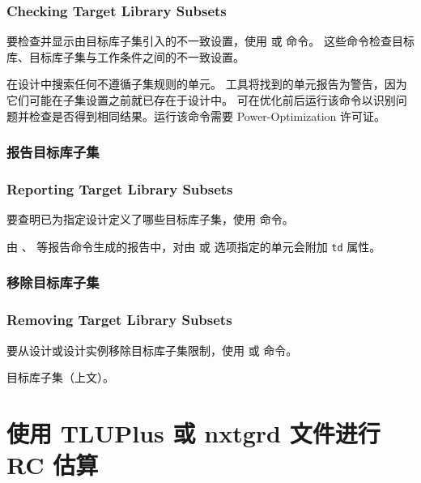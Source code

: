 \subsubsection*{Checking Target Library Subsets}

要检查并显示由目标库子集引入的不一致设置，使用  或
 命令。
这些命令检查目标库、目标库子集与工作条件之间的不一致设置。

 在设计中搜索任何不遵循子集规则的单元。
工具将找到的单元报告为警告，因为它们可能在子集设置之前就已存在于设计中。
可在优化前后运行该命令以识别问题并检查是否得到相同结果。运行该命令需要 Power-Optimization 许可证。

\subsubsection{报告目标库子集}
\subsubsection*{Reporting Target Library Subsets}

要查明已为指定设计定义了哪些目标库子集，使用  命令。

由 、 等报告命令生成的报告中，对由  或  选项指定的单元会附加 \texttt{td} 属性。

\subsubsection{移除目标库子集}
\subsubsection*{Removing Target Library Subsets}

要从设计或设计实例移除目标库子集限制，使用  或  命令。

\begin{seeAlsoBox}
目标库子集（上文）。
\end{seeAlsoBox}

\section{使用 TLUPlus 或 nxtgrd 文件进行 RC 估算}
